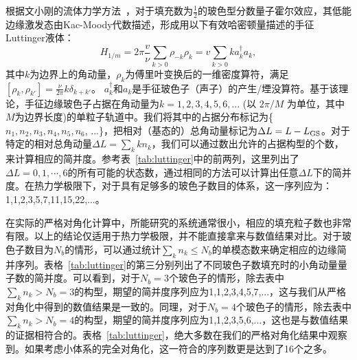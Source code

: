 

根据文小刚的流体力学方法~\cite{Wen1995}，对于填充数为$\frac{1}{2}$的玻色型分数量子霍尔效应，其低能边缘激发态由Kac-Moody代数描述，形成用以下有效哈密顿量描述的手征Luttinger液体：
\begin{equation}\label{eq:luttinger}
   H_{1/m}=2\pi \frac{v}{\nu}\displaystyle\sum_{k>0}\rho_{-k}\rho_k=v\sum_{k>0} k a^{\dagger}_k a_k,
\end{equation}
其中$k$为边界上的角动量，$\rho_k$为傅里叶变换后的一维密度算符，满足$[\rho_k,\rho_{k'}]=\frac{\nu}{2\pi}k\delta_{k+k'}$。 $a^{\dagger}_k$和$a_k$是手征玻色子（声子）的产生/堙没算符。基于该理论，手征边缘玻色子占据在角动量为$k=1, 2, 3, 4, 5, 6, ...$ (以 $2\pi/M$ 为单位，其中$M$为边界长度)的单粒子轨道中。我们将其中的占据分布标记为\{$n_1,n_2,n_3,n_4,n_5,n_6$, ...\}，把相对（基态的）总角动量标记为$\Delta L = L - L_{\rm GS}$。对于特定的相对总角动量$\Delta L = \sum_{k} kn_{k}$，我们可以通过数出允许的占据构型的个数，来计算相应的简并度。参考表~\ref{tab:luttinger}中的前两列，这里列出了$\Delta L = 0,1,\cdots,6$的所有可能的状态数，通过相同的方法可以计算出任意$\Delta L$下的简并度。在热力学极限下，对于具有足够多的玻色子数目的体系，这一序列应为：1,1,2,3,5,7,11,15,22,...。

在实际的严格对角化计算中，所能研究的系统通常很小，相应的填充粒子数也非常有限。以上的结论仅适用于热力学极限，并不能直接拿来与数值结果对比。对于玻色子数目为$N_b$的情形，可以通过统计$\sum_k n_k\le N_b$的单模态数来确定相应的边缘简并序列。表格~\ref{tab:luttinger}的第三分别列出了不同玻色子数填充时的小角动量量子数的简并度。可以看到，对于$N_b=3$个玻色子的情形，除去表中$\sum_k n_k>N_b=3$的构型，期望的简并度序列应为1,1,2,3,4,5,7,...，这与我们从严格对角化中得到的数值结果是一致的。同理，对于$N_b=4$个玻色子的情形，除去表中$\sum_k n_k>N_b=4$的构型，期望的简并度序列应为1,1,2,3,5,6,...，这也是与数值结果的证据相符合的。表格~\ref{tab:luttinger}，绝大多数在我们的严格对角化结果中观察到。如果考虑小体系的完全对角化，这一符合的序列数更是达到了16个之多。

